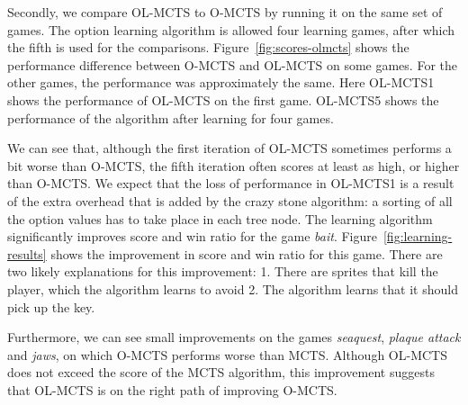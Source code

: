 Secondly, we compare OL-MCTS to O-MCTS by running it on the same set of games.
The option learning algorithm is allowed four learning games, after which the
fifth is used for the comparisons. Figure~\ref{fig:scores-olmcts} shows the
performance difference between O-MCTS and OL-MCTS on some games. For the other
games, the performance was approximately the same. Here OL-MCTS1 shows the
performance of OL-MCTS on the first game. OL-MCTS5 shows the performance of the
algorithm after learning for four games. 

We can see that, although the first iteration of OL-MCTS sometimes performs a
bit worse than O-MCTS, the fifth iteration often scores at least as high, or
higher than O-MCTS\@. We expect that the loss of performance in OL-MCTS1 is
a result of the extra overhead that is added by the crazy stone algorithm: a
sorting of all the option values has to take place in each tree node. The
learning algorithm significantly improves score and win ratio for the game
\textit{bait}.
Figure~\ref{fig:learning-results} shows the improvement in score and win ratio
for this game. There are two likely explanations for this improvement: 1. There
are sprites that kill the player, which the algorithm learns to avoid  2. The
algorithm learns that it should pick up the key.

Furthermore, we can see small improvements on the games \textit{seaquest},
\textit{plaque attack} and \textit{jaws}, on which O-MCTS performs worse than
MCTS\@.  Although OL-MCTS does not exceed the score of the MCTS algorithm, this
improvement suggests that OL-MCTS is on the right path of improving O-MCTS\@.

